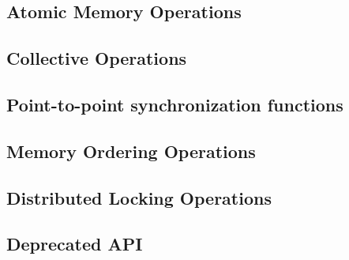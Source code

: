 \documentclass[10pt]{book}
\begin{document}
{\subsection{Atomic Memory Operations}

\subsection{Collective Operations}
\label{subsec:coll}

\label{subsec:shmem_barrier_all}
\label{subsec:shmem_barrier}
\label{subsec:shmem_broadcast}
\label{subsec:shmem_reductions}
\subsection{Point-to-point synchronization functions}%
\subsection{Memory Ordering Operations} %
\label{subsec:memory_order}
\label{subsec:shmem_fence}
\label{subsec:shmem_quiet}


\subsection{Distributed Locking Operations}
\subsection{Deprecated API}

}
\end{document}
